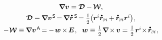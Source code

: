\nopagebreak\vspace{-0.1em}\begin{equation}
\begin{array}{c}
\boldnabla \bm{v} = \rateofdeformationtensor - \hspace{-0.1ex} \vorticitytensor
,
\\[.333em]
%
\rateofdeformationtensor \equiv \hspace{-0.12ex} \boldnabla {\bm{v}}^{\hspace{.2ex}\mathsf{S}} \hspace{-0.32ex}
=  \hspace{-0.2ex} \boldnabla \mathdotabove{\currentlocationvector}^{\hspace{.3ex}\mathsf{S}} \hspace{-0.32ex}
= \smalldisplaystyleonehalf \bigl( \hspace{-0.1ex} \currentlocationvector^{i} \mathdotabove{\currentlocationvector}_\differentialindex{i} \hspace{-0.1ex} + \hspace{-0.1ex} \mathdotabove{\currentlocationvector}_\differentialindex{i} \currentlocationvector^{i} \bigr)
\hspace{.1ex} ,
\\[.44em]
%
- \hspace{.1ex} \vorticitytensor \equiv \hspace{-0.12ex} \boldnabla {\bm{v}}^{\hspace{.2ex}\mathsf{A}} \hspace{-0.25ex}
= \hspace{-0.1ex} - \hspace{.24ex} \vorticityvector \hspace{-0.12ex} \times \hspace{-0.2ex} \UnitDyad
\hspace{.1ex} , \hspace{.6em}
\vorticityvector \equiv \hspace{.1ex} \smalldisplaystyleonehalf \hspace{.15ex} \boldnabla \hspace{-0.2ex} \times \hspace{-0.1ex} \bm{v}
= \hspace{.1ex} \smalldisplaystyleonehalf \hspace{.25ex} \currentlocationvector^{i} \hspace{-0.4ex}\times\hspace{-0.3ex} \mathdotabove{\currentlocationvector}_\differentialindex{i}
\hspace{.1ex} ,
\end{array}
\end{equation}

